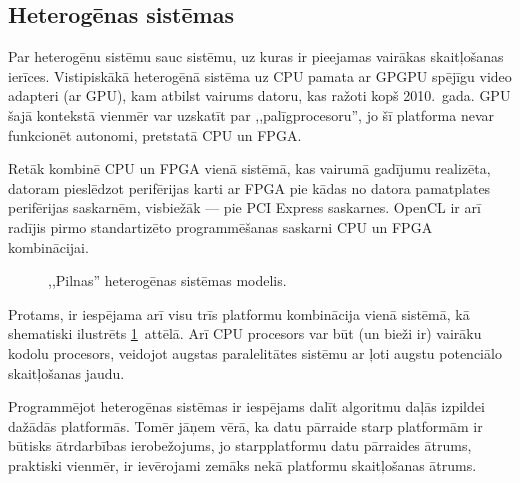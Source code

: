 \subsection{Heterogēnas sistēmas} \label{sec:heterogenous}
Par heterogēnu sistēmu sauc sistēmu, uz kuras ir pieejamas vairākas
skaitļošanas ierīces. Vistipiskākā heterogēnā sistēma uz CPU pamata ar
GPGPU spējīgu video adapteri (ar GPU), kam atbilst vairums datoru, kas
ražoti kopš 2010.~gada.
GPU šajā kontekstā vienmēr var uzskatīt par ,,palīgprocesoru'',
jo šī platforma nevar funkcionēt autonomi, pretstatā CPU un FPGA.

Retāk kombinē CPU un FPGA vienā sistēmā, kas vairumā gadījumu realizēta,
datoram pieslēdzot perifērijas karti ar FPGA pie kādas no datora
pamatplates perifērijas saskarnēm, visbiežāk --- pie PCI Express
saskarnes. OpenCL ir arī radījis pirmo standartizēto programmēšanas
saskarni CPU un FPGA kombinācijai. %

\begin{figure}[tbh]
	\centering
	\def\svgscale{1.4}
	{}
	\caption{,,Pilnas'' heterogēnas sistēmas modelis.}
	\label{fig:hetero-sys}
\end{figure}

Protams, ir iespējama arī visu trīs platformu kombinācija vienā sistēmā, kā
shematiski ilustrēts \ref{fig:hetero-sys}~attēlā. Arī CPU procesors var
būt (un bieži ir) vairāku kodolu procesors, veidojot augstas paralelitātes
sistēmu ar ļoti augstu potenciālo skaitļošanas jaudu.

Programmējot heterogēnas sistēmas ir iespējams dalīt algoritmu daļās
izpildei dažādās platformās. Tomēr jāņem vērā, ka datu pārraide starp
platformām ir būtisks ātrdarbības ierobežojums, jo starpplatformu 
datu pārraides ātrums, praktiski vienmēr, ir ievērojami zemāks nekā
platformu skaitļošanas ātrums.


